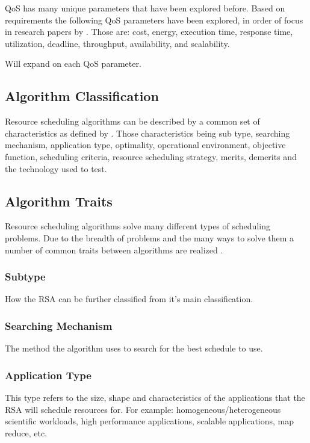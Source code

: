 \documentclass[12pt]{article}
\begin{document}
QoS has many unique parameters that have been explored before. Based on requirements the following QoS parameters have been explored, in order of focus in research papers by \textcite{Singh2016}. Those are: cost, energy, execution time, response time, utilization, deadline, throughput, availability, and scalability.

Will expand on each QoS parameter.

\subsection{Algorithm Classification} \label{sub:algclassification}


Resource scheduling algorithms can be described by a common set of characteristics as defined by \textcite{Singh2016}. Those characteristics being sub type, searching mechanism, application type, optimality, operational environment, objective function, scheduling criteria, resource scheduling strategy, merits, demerits and the technology used to test.

\subsection{Algorithm Traits} \label{sub:algtraits}

Resource scheduling algorithms solve many different types of scheduling problems. Due to the breadth of problems and the many ways to solve them a number of common traits between algorithms are realized \cite{Singh2016}.

\subsubsection{Subtype} How the RSA can be further classified from it's main classification.

\subsubsection{Searching Mechanism} The method the algorithm uses to search for the best schedule to use.

\subsubsection{Application Type} This type refers to the size, shape and characteristics of the applications that the RSA will schedule resources for. For example: homogeneous/heterogeneous scientific workloads, high performance applications, scalable applications, map reduce, etc.
\end{document}
